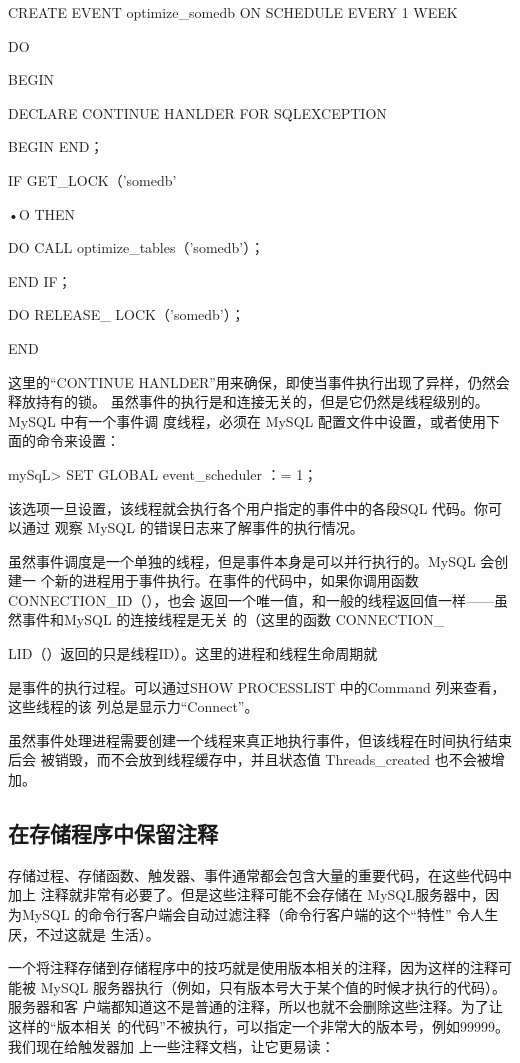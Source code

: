 CREATE EVENT optimize\_somedb ON SCHEDULE EVERY 1 WEEK

DO

BEGIN

DECLARE CONTINUE HANLDER FOR SQLEXCEPTION

BEGIN END；

IF GET\_LOCK（'somedb'

•O THEN

DO CALL optimize\_tables（'somedb'）；

END IF；

DO RELEASE\_ LOCK（'somedb'）；

END

这里的“CONTINUE HANLDER”用来确保，即使当事件执行出现了异样，仍然会释放持有的锁。
虽然事件的执行是和连接无关的，但是它仍然是线程级别的。MySQL 中有一个事件调
度线程，必须在 MySQL 配置文件中设置，或者使用下面的命令来设置：

mySqL> SET GLOBAL event\_scheduler ：= 1；

该选项一旦设置，该线程就会执行各个用户指定的事件中的各段SQL 代码。你可以通过
观察 MySQL 的错误日志来了解事件的执行情况。

虽然事件调度是一个单独的线程，但是事件本身是可以并行执行的。MySQL 会创建一
个新的进程用于事件执行。在事件的代码中，如果你调用函数CONNECTION\_ID（），也会
返回一个唯一值，和一般的线程返回值一样——虽然事件和MySQL 的连接线程是无关
的（这里的函数 CONNECTION\_

LID（）返回的只是线程ID）。这里的进程和线程生命周期就

是事件的执行过程。可以通过SHOW PROCESSLIST 中的Command 列来查看，这些线程的该
列总是显示力“Connect”。

虽然事件处理进程需要创建一个线程来真正地执行事件，但该线程在时间执行结束后会
被销毁，而不会放到线程缓存中，并且状态值 Threads\_created 也不会被增加。

\subsection{在存储程序中保留注释}
存储过程、存储函数、触发器、事件通常都会包含大量的重要代码，在这些代码中加上
注释就非常有必要了。但是这些注释可能不会存储在 MySQL服务器中，因为MySQL
的命令行客户端会自动过滤注释（命令行客户端的这个“特性” 令人生厌，不过这就是
生活）。

一个将注释存储到存储程序中的技巧就是使用版本相关的注释，因为这样的注释可能被
MySQL 服务器执行（例如，只有版本号大于某个值的时候才执行的代码）。服务器和客
户端都知道这不是普通的注释，所以也就不会删除这些注释。为了让这样的“版本相关
的代码”不被执行，可以指定一个非常大的版本号，例如99999。我们现在给触发器加
上一些注释文档，让它更易读：

